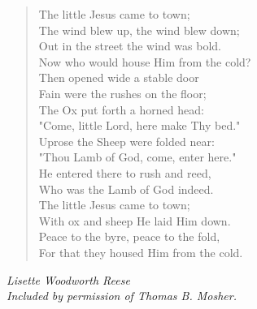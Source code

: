 
\begin{verse}
The little Jesus came to town;\\
The wind blew up, the wind blew down;\\
Out in the street the wind was bold.\\
Now who would house Him from the cold?\\[0.7em]

Then opened wide a stable door\\
Fain were the rushes on the floor;\\
The Ox put forth a horned head:\\
"Come, little Lord, here make Thy bed."\\[0.7em]

Uprose the Sheep were folded near:\\
"Thou Lamb of God, come, enter here."\\
He entered there to rush and reed,\\
Who was the Lamb of God indeed.\\[0.7em]

The little Jesus came to town;\\
With ox and sheep He laid Him down.\\
Peace to the byre, peace to the fold,\\
For that they housed Him from the cold.%
\end{verse}

\vspace{0.5\baselineskip}
\noindent\textit{Lisette Woodworth Reese}\\
\noindent\textit{Included by permission of Thomas B. Mosher.}

\newpage
